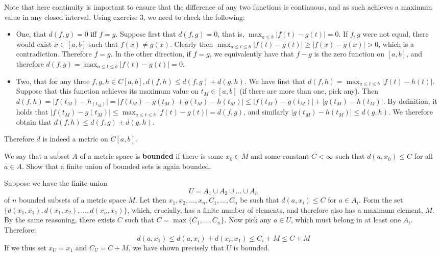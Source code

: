 \begin{solution}
    
    Note that here continuity is important to ensure that the difference of any two functions is continuous, and as such achieves a maximum value in any closed interval.
    Using exercise 3, we need to check the following:
    \begin{itemize}
        \item One, that $d(f, g) = 0$ iff $f = g$.
        Suppose first that $d(f, g) = 0$, that is, $\max_{a \leq b} \lvert f(t) - g(t) \rvert = 0$.
        If $f, g$ were not equal, there would exist $x \in [a, b]$ such that $f(x) \neq g(x)$.
        Clearly then $\max_{a \leq t \leq b} \lvert f(t) - g(t) \rvert \geq \lvert f(x) - g(x) \rvert > 0$, which is a contradiction.
        Therefore $f = g$.
        In the other direction, if $f = g$, we equivalently have that $f - g$ is the zero function on $[a, b]$, and therefore $d(f, g) = \max_{a \leq t \leq b} \lvert f(t) - g(t) \rvert = 0$.
        \item Two, that for any three $f, g, h \in C[a, b], d(f, h) \leq d(f, g) + d(g, h)$.
        We have first that $d(f, h) = \max_{a \leq t \leq b} \lvert f(t) - h(t) \rvert$.
        Suppose that this function achieves its maximum value on $t_M \in [a, b]$ (if there are more than one, pick any).
        Then $d(f, h) = \lvert f(t_M) - h_(t_M) \rvert = \lvert f(t_M) - g(t_M) + g(t_M) - h(t_M) \rvert \leq \lvert f(t_M) - g(t_M) \rvert + \lvert g(t_M) - h(t_M) \rvert$.
        By definition, it holds that $\lvert f(t_M) - g(t_M) \rvert \leq \max_{a \leq t \leq b} \lvert f(t) - g(t) \rvert = d(f, g)$, and similarly $\lvert g(t_M) - h(t_M) \rvert \leq d(g, h)$.
        We therefore obtain that $d(f, h) \leq d(f, g) + d(g, h)$.
    \end{itemize}
    Therefore $d$ is indeed a metric on $C[a, b]$.
\end{solution}

\begin{exercise}{14}
    We say that a subset $A$ of a metric space is \textbf{bounded} if there is some $x_0 \in M$ and some constant $C < \infty$ such that $d(a, x_0) \leq C$ for all $a \in A$.
    Show that a finite union of bounded sets is again bounded.
\end{exercise}

\begin{solution}
    
    Suppose we have the finite union 
    $$U = A_1 \cup A_2 \cup \ldots \cup A_n$$
    of $n$ bounded subsets of a metric space $M$.
    Let then $x_1, x_2, \ldots, x_n, C_1, \ldots, C_n$ be such that $d(a, x_i) \leq C$ for $a \in A_i$.
    Form the set $\{d(x_1, x_1), d(x_1, x_2), \ldots, d(x_n, x_1)\}$, which, crucially, has a finite number of elements, and therefore also has a maximum element, $M$.
    By the same reasoning, there exists $C$ such that $C = \max\{C_1, \ldots, C_n\}$.
    Now pick any $a \in U$, which must belong in at least one $A_i$.
    Therefore:
    $$d(a, x_1) \leq d(a, x_i) + d(x_i, x_1) \leq C_i + M \leq C + M$$
    If we thus set $x_U = x_1$ and $C_U = C + M$, we have shown precisely that $U$ is bounded.
\end{solution}

